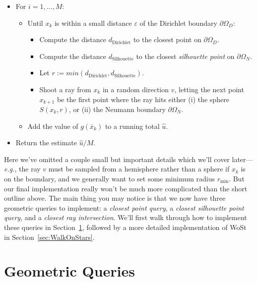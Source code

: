 \documentclass{article}
\newcommand{\eg}{\emph{e.g.}} %
\renewcommand{\vec}[1]{#1}
\begin{document}
\begin{itemize}
   \item For \(i = 1, \ldots, M\):
\begin{itemize}
   \item Until \(\vec{x}_k\) is within a small distance \(\varepsilon\) of the Dirichlet boundary \(\partial\Omega_D\):
      \begin{itemize}
         \item Compute the distance \(d_{\text{Dirichlet}}\) to the closest point on \(\partial\Omega_D\).
         \item Compute the distance \(d_{\text{Silhouette}}\) to the closest \emph{silhouette point} on \(\partial\Omega_N\).
         \item Let \(r := min(d_{\text{Dirichlet}},d_{\text{Silhouette}})\).
         \item Shoot a ray from \(\vec{x}_k\) in a random direction \(v\), letting the next point \(\vec{x}_{k+1}\) be the first point where the ray hits either (i) the sphere \(S(\vec{x}_k,r)\), or (ii) the Neumann boundary \(\partial\Omega_N\).
      \end{itemize}
   \item Add the value of \(g(\overline{\vec{x}}_k)\) to a running total \(\widehat{u}\).
\end{itemize}
   \item Return the estimate \(\widehat{u}/M\).
\end{itemize}

Here we've omitted a couple small but important details which we'll cover later---\eg{}, the ray \(\vec{v}\) must be sampled from a hemisphere rather than a sphere if \(\vec{x}_k\) is on the boundary, and we generally want to set some minimum radius \(r_{\min}\).  But our final implementation really won't be much more complicated than the short outline above.  The main thing you may notice is that we now have three geometric queries to implement: a \emph{closest point query}, a \emph{closest silhouette point query}, and a \emph{closest ray intersection}.  We'll first walk through how to implement these queries in Section~\ref{sec:GeometricQueries}, followed by a more detailed implementation of WoSt in Section~\ref{sec:WalkOnStars}.


\section{Geometric Queries}
\label{sec:GeometricQueries}
\end{document}
